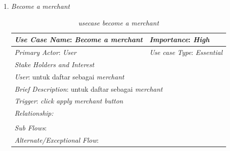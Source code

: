 \documentclass[a4paper]{article}
\begin{document}
\begin{enumerate}
\begin{enumerate}
        \item \textit{Become a merchant}
\begin{table}[h]
    \centering
    \caption{\textit{usecase become a merchant} }
    \begin{tabular}{|lll}
    \hline
    \multicolumn{1}{|l|}{\textit{Use Case Name}: \textit{Become a merchant}}             & \multicolumn{2}{l|}{\textit{Importance}: \textit{High}}   \\ \hline
    \multicolumn{1}{|l|}{\textit{Primary Actor}: \textit{User}}             & \multicolumn{2}{l|}{\textit{Use case Type}: \textit{Essential}} \\ \hline
    \multicolumn{1}{|l|}{\textit{Stake Holders and Interest}} &                               &                               \\ \cline{1-1}
    \multicolumn{1}{|l|}{\textit{User}: untuk daftar sebagai \textit{merchant}}                                                     &                               &                               \\ \hline
    \multicolumn{3}{|l|}{\textit{Brief Description}: untuk daftar sebagai \textit{merchant}}                                                                         \\ \hline
    \multicolumn{3}{|l|}{\textit{Trigger}: \textit{click apply merchant button}}                                                                                   \\ \hline
    \multicolumn{3}{|l|}{\textit{Relationship:}}                                                                              \\ \hline
    \multicolumn{3}{|l|}{}                                                                                                                     \\ \hline
    \multicolumn{3}{|l|}{\textit{Sub Flows}:}                                                                                 \\ \hline
    \multicolumn{3}{|l|}{\textit{Alternate/Exceptional Flow}:}                                                                \\ \hline
    \end{tabular}
\end{table}

        \newpage


\end{enumerate}
\end{enumerate}
\end{document}
